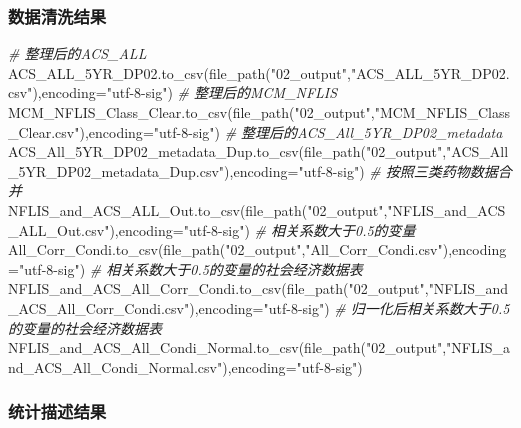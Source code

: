 \documentclass[
]{article}
\newenvironment{Shaded}{}{}
\newcommand{\CommentTok}[1]{\textcolor[rgb]{0.38,0.63,0.69}{\textit{#1}}}
\newcommand{\NormalTok}[1]{#1}
\newcommand{\OperatorTok}[1]{\textcolor[rgb]{0.40,0.40,0.40}{#1}}
\newcommand{\StringTok}[1]{\textcolor[rgb]{0.25,0.44,0.63}{#1}}
\begin{document}
\hypertarget{header-n346}{%
\subsubsection{数据清洗结果}\label{header-n346}}

\begin{Shaded}
\begin{Highlighting}[]
\CommentTok{\# 整理后的ACS\_ALL}
\NormalTok{ACS\_ALL\_5YR\_DP02.to\_csv(file\_path(}\StringTok{"02\_output"}\NormalTok{,}\StringTok{"ACS\_ALL\_5YR\_DP02.csv"}\NormalTok{),encoding}\OperatorTok{=}\StringTok{"utf{-}8{-}sig"}\NormalTok{)}
\CommentTok{\# 整理后的MCM\_NFLIS}
\NormalTok{MCM\_NFLIS\_Class\_Clear.to\_csv(file\_path(}\StringTok{"02\_output"}\NormalTok{,}\StringTok{"MCM\_NFLIS\_Class\_Clear.csv"}\NormalTok{),encoding}\OperatorTok{=}\StringTok{"utf{-}8{-}sig"}\NormalTok{)}
\CommentTok{\# 整理后的ACS\_All\_5YR\_DP02\_metadata}
\NormalTok{ACS\_All\_5YR\_DP02\_metadata\_Dup.to\_csv(file\_path(}\StringTok{"02\_output"}\NormalTok{,}\StringTok{"ACS\_All\_5YR\_DP02\_metadata\_Dup.csv"}\NormalTok{),encoding}\OperatorTok{=}\StringTok{"utf{-}8{-}sig"}\NormalTok{)}
\CommentTok{\# 按照三类药物数据合并}
\NormalTok{NFLIS\_and\_ACS\_ALL\_Out.to\_csv(file\_path(}\StringTok{"02\_output"}\NormalTok{,}\StringTok{"NFLIS\_and\_ACS\_ALL\_Out.csv"}\NormalTok{),encoding}\OperatorTok{=}\StringTok{"utf{-}8{-}sig"}\NormalTok{)}
\CommentTok{\# 相关系数大于0.5的变量}
\NormalTok{All\_Corr\_Condi.to\_csv(file\_path(}\StringTok{"02\_output"}\NormalTok{,}\StringTok{"All\_Corr\_Condi.csv"}\NormalTok{),encoding}\OperatorTok{=}\StringTok{"utf{-}8{-}sig"}\NormalTok{)}
\CommentTok{\# 相关系数大于0.5的变量的社会经济数据表}
\NormalTok{NFLIS\_and\_ACS\_All\_Corr\_Condi.to\_csv(file\_path(}\StringTok{"02\_output"}\NormalTok{,}\StringTok{"NFLIS\_and\_ACS\_All\_Corr\_Condi.csv"}\NormalTok{),encoding}\OperatorTok{=}\StringTok{"utf{-}8{-}sig"}\NormalTok{)}
\CommentTok{\# 归一化后相关系数大于0.5的变量的社会经济数据表}
\NormalTok{NFLIS\_and\_ACS\_All\_Condi\_Normal.to\_csv(file\_path(}\StringTok{"02\_output"}\NormalTok{,}\StringTok{"NFLIS\_and\_ACS\_All\_Condi\_Normal.csv"}\NormalTok{),encoding}\OperatorTok{=}\StringTok{"utf{-}8{-}sig"}\NormalTok{)}
\end{Highlighting}
\end{Shaded}

\hypertarget{header-n349}{%
\subsubsection{统计描述结果}\label{header-n349}}
\end{document}
